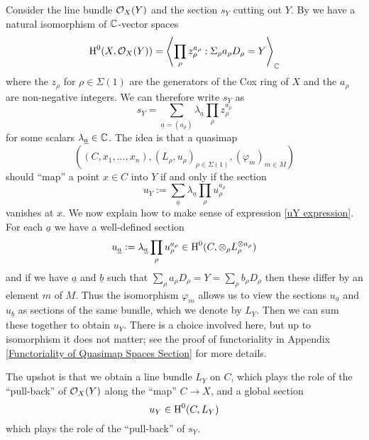 Consider the line bundle $\mathcal{O}_X(Y)$ and the section $s_Y$ cutting out $Y$. By \cite{CoxRing} we have a natural isomorphism of $\mathbb{C}$-vector spaces
\begin{equation*} \operatorname{H}^0(X,\mathcal{O}_X(Y)) = \left\langle \prod_{\rho} z_\rho^{a_\rho} : \Sigma_\rho a_\rho D_\rho = Y \right\rangle_{\mathbb{C}} \end{equation*}
where the $z_\rho$ for $\rho \in \Sigma(1)$ are the generators of the Cox ring of $X$ and the $a_\rho$ are non-negative integers. We can therefore write $s_Y$ as
\begin{equation*} s_Y = \sum_{\underline{a}=(a_\rho)} \lambda_{\underline{a}} \prod_\rho z_\rho^{a_\rho} \end{equation*}
for some scalars $\lambda_{\underline{a}} \in \mathbb{C}$. The idea is that a quasimap
\begin{equation*} ((C,x_1,\ldots,x_n), (L_\rho,u_\rho)_{\rho \in \Sigma(1)}, (\varphi_m)_{m \in M}) \end{equation*}
should ``map'' a point $x \in C$ into $Y$ if and only if the section
\begin{equation} \label{uY expression} u_Y := \sum_{\underline{a}} \lambda_{\underline{a}} \prod_\rho u_\rho^{a_\rho} \end{equation}
vanishes at $x$. We now explain how to make sense of expression \eqref{uY expression}. For each $\underline{a}$ we have a well-defined section
\begin{equation*} u_{\underline{a}} := \lambda_{\underline{a}} \prod_\rho u_\rho^{a_\rho} \in \operatorname{H}^0(C,\otimes_\rho L_\rho^{\otimes a_\rho}) \end{equation*}
and if we have $\underline{a}$ and $\underline{b}$ such that $\sum_\rho a_\rho D_\rho = Y = \sum_\rho b_\rho D_\rho$ then these differ by an element $m$ of $M$. Thus the isomorphism $\varphi_m$ allows us to view the sections $u_{\underline{a}}$ and $u_{\underline{b}}$ as sections of the same bundle, which we denote by $L_Y$. Then we can sum these together to obtain $u_Y$. There is a choice involved here, but up to isomorphism it does not matter; see the proof of functoriality in Appendix \ref{Functoriality of Quasimap Spaces Section} for more details.

The upshot is that we obtain a line bundle $L_Y$ on $C$, which plays the role of the ``pull-back'' of $\mathcal{O}_X(Y)$ along the ``map'' $C \to X$, and a global section
\begin{equation*} u_Y \in \operatorname{H}^0(C,L_Y) \end{equation*}
which plays the role of the ``pull-back'' of $s_Y$.

